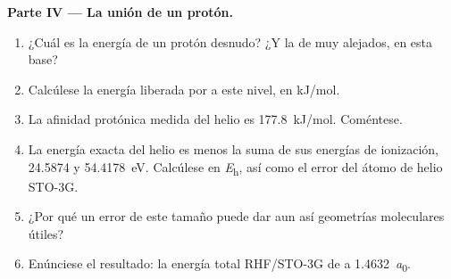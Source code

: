\begin{problem}
\medskip\noindent\textbf{Parte IV --- La unión de un protón.}
\begin{enumerate}[resume]
  \item ¿Cuál es la energía de un protón desnudo? ¿Y la de  muy alejados, en esta
        base?
  \item Calcúlese la energía liberada por  a este nivel, en
        \unit{kJ/mol}.
  \item La afinidad protónica medida del helio es \qty{177.8}{kJ/mol}.
        Coméntese.
  \item La energía exacta del helio es menos la suma de sus energías de
        ionización, 24.5874 y \qty{54.4178}{eV}. Calcúlese en \unit{\hartree}, así como
        el error del átomo de helio STO-3G.
  \item ¿Por qué un error de este tamaño puede dar aun así geometrías moleculares
        útiles?
  \item Enúnciese el resultado: la energía total RHF/STO-3G de  a
        \qty{1.4632}{\bohr}.
\end{enumerate}
\end{problem}
